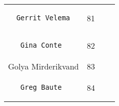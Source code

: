 \documentclass[]{article}
\begin{document}
\begin{longtable}[c]{@{}llll@{}}
\begin{minipage}[t]{0.39\columnwidth}
\begin{verbatim}
  Gerrit Velema
\end{verbatim}
\end{minipage} & \begin{minipage}[t]{0.10\columnwidth}\raggedright
81
\end{minipage} & \begin{minipage}[t]{0.13\columnwidth}\raggedright
\end{minipage} & \begin{minipage}[t]{0.15\columnwidth}\raggedright
\end{minipage}
\\\noalign{\medskip}
\begin{minipage}[t]{0.39\columnwidth}\raggedright
\begin{verbatim}
   Gina Conte
\end{verbatim}
\end{minipage} & \begin{minipage}[t]{0.10\columnwidth}\raggedright
82
\end{minipage} & \begin{minipage}[t]{0.13\columnwidth}\raggedright
\end{minipage} & \begin{minipage}[t]{0.15\columnwidth}\raggedright
\end{minipage}
\\\noalign{\medskip}
\begin{minipage}[t]{0.39\columnwidth}\raggedright
Golya Mirderikvand
\end{minipage} & \begin{minipage}[t]{0.10\columnwidth}\raggedright
83
\end{minipage} & \begin{minipage}[t]{0.13\columnwidth}\raggedright
\end{minipage} & \begin{minipage}[t]{0.15\columnwidth}\raggedright
\end{minipage}
\\\noalign{\medskip}
\begin{minipage}[t]{0.39\columnwidth}\raggedright
\begin{verbatim}
   Greg Baute
\end{verbatim}
\end{minipage} & \begin{minipage}[t]{0.10\columnwidth}\raggedright
84
\end{minipage} & \begin{minipage}[t]{0.13\columnwidth}\raggedright

\end{minipage}
\end{longtable}
\end{document}
